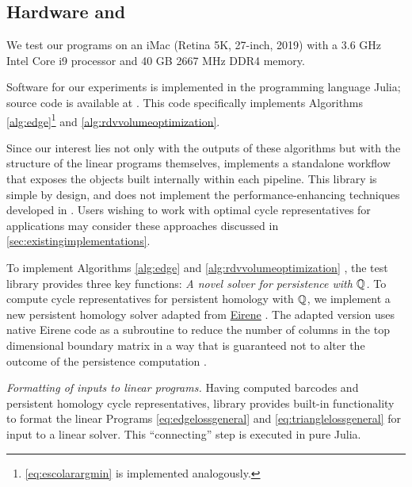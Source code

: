 \subsection{Hardware and \DIFdelbegin {}\DIFdelend \DIFaddbegin {}\DIFaddend }
\label{subsec:hardwaresoftware}

We test our programs on an iMac (Retina 5K, 27-inch, 2019) with a 3.6 GHz Intel Core i9 processor and 40 GB 2667 MHz DDR4 memory.


Software for our experiments is implemented in the programming language Julia; source code is available at \cite{li_thompson}.  This code specifically implements Algorithms \ref{alg:edge}\footnote{ \pr \eqref{eq:escolarargmin} is implemented analogously.} and \ref{alg:rdvvolumeoptimization}.


Since our interest lies not only with the outputs of these algorithms but with the structure of the linear programs themselves, \cite{li_thompson} implements a standalone workflow that exposes the objects built internally within each pipeline.  This library is simple by design, and does not implement the performance-enhancing techniques  developed in \cite{Escolar2016, Obayashi2018}. Users wishing to work with optimal cycle representatives for applications may consider these approaches 
discussed in \se \ref{sec:existingimplementations}.


To implement  Algorithms \ref{alg:edge} and \ref{alg:rdvvolumeoptimization} \DIFaddbegin {}\DIFaddend , the test library \cite{li_thompson} provides three key functions:  
\emph{A novel solver for persistence with $\mathbb{Q}$\DIFdelbegin {}\DIFdelend \DIFaddbegin {}\DIFaddend .} To compute cycle representatives for persistent homology with $\mathbb{Q}$\DIFdelbegin {}\DIFdelend \DIFaddbegin {}\DIFaddend , we implement a new persistent homology solver adapted from  \url{Eirene}  \cite{eirenecode}.  The adapted version uses native Eirene code as a subroutine to reduce the number of columns in the top dimensional boundary matrix in a way that is guaranteed not to alter the outcome of the persistence computation \cite{eirene}.

\emph{Formatting of inputs to linear programs.} 
Having computed barcodes and persistent homology cycle representatives, library \cite{li_thompson}  provides built-in functionality to format the linear Programs \eqref{eq:edgelossgeneral} and \eqref{eq:trianglelossgeneral} for input to a linear solver.  This ``connecting'' step is executed in pure Julia. 


